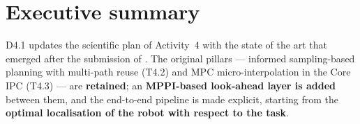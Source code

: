 \section{Executive summary}\label{sec:exec}

\begin{planbox}
D4.1 updates the scientific plan of Activity~4 with the state of the art that emerged after the submission of \PlanARI. The original pillars --- informed sampling-based planning with multi-path reuse (T4.2) and MPC micro-interpolation in the Core IPC (T4.3) --- are \textbf{retained}; an \textbf{MPPI-based look-ahead layer is added} between them, and the end-to-end pipeline is made explicit, starting from the \textbf{optimal localisation of the robot with respect to the task}.
\end{planbox}

